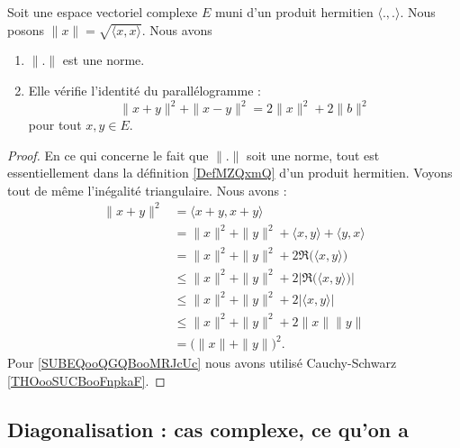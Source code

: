 \begin{proposition}        \label{PROPooSSYJooHAXAnC}
	Soit une espace vectoriel complexe \( E\) muni d'un produit hermitien \( \langle ., .\rangle \). Nous posons \( \| x \|=\sqrt{ \langle x, x\rangle  }\). Nous avons
	\begin{enumerate}
		\item
		      \( \| . \|\) est une norme.
		\item
		      Elle vérifie l'identité du parallélogramme :
		      \begin{equation}
			      \| x+y \|^2+\| x-y \|^2=2\| x \|^2+2\| b \|^2
		      \end{equation}
		      pour tout \( x,y\in E\).
	\end{enumerate}
\end{proposition}

\begin{proof}
	En ce qui concerne le fait que \( \| . \|\) soit une norme, tout est essentiellement dans la définition \ref{DefMZQxmQ} d'un produit hermitien. Voyons tout de même l'inégalité triangulaire. Nous avons :
	\begin{subequations}
		\begin{align}
			\| x+y \|^2 & =\langle x+y, x+y\rangle                                            \\
			            & =\| x \|^2+\| y \|^2+\langle x, y\rangle +\langle y, x\rangle       \\
			            & =\| x \|^2+\| y \|^2+2\Re\big( \langle x, y\rangle  \big)           \\
			            & \leq\| x \|^2+\| y \|^2+2|\Re\big( \langle x, y\rangle  \big)|      \\
			            & \leq\| x \|^2+\| y \|^2+2| \langle x, y\rangle  |                   \\
			            & \leq \| x \|^2+\| y \|^2+2\| x \|\| y \|\label{SUBEQooQGQBooMRJcUc} \\
			            & =\big( \| x \|+\| y \| \big)^2.
		\end{align}
	\end{subequations}
	Pour \eqref{SUBEQooQGQBooMRJcUc} nous avons utilisé Cauchy-Schwarz \ref{THOooSUCBooFnpkaF}.
\end{proof}

\subsection{Diagonalisation : cas complexe, ce qu'on a}

